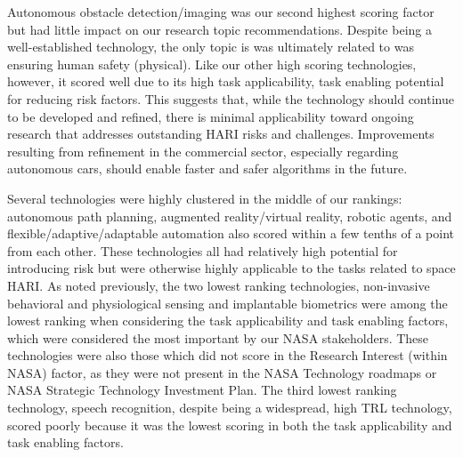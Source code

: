 Autonomous obstacle detection/imaging was our second highest scoring factor but had little impact on our research topic recommendations.
Despite being a well-established technology, the only topic is was ultimately related to was ensuring human safety (physical).
Like our other high scoring technologies, however, it scored well due to its high task applicability, task enabling potential for reducing risk factors.
This suggests that, while the technology should continue to be developed and refined, there is minimal applicability toward ongoing research that addresses outstanding HARI risks and challenges.
Improvements resulting from refinement in the commercial sector, especially regarding autonomous cars, should enable faster and safer algorithms in the future.

Several technologies were highly clustered in the middle of our rankings: autonomous path planning, augmented reality/virtual reality, robotic agents, and flexible/adaptive/adaptable automation also scored within a few tenths of a point from each other.
These technologies all had relatively high potential for introducing risk but were otherwise highly applicable to the tasks related to space HARI.
As noted previously, the two lowest ranking technologies, non-invasive behavioral and physiological sensing and implantable biometrics were among the lowest ranking when considering the task applicability and task enabling factors, which were considered the most important by our NASA stakeholders.
These technologies were also those which did not score in the Research Interest (within NASA) factor, as they were not present in the NASA Technology roadmaps or NASA Strategic Technology Investment Plan.
The third lowest ranking technology, speech recognition, despite being a widespread, high TRL technology, scored poorly because it was the lowest scoring in both the task applicability and task enabling factors.


